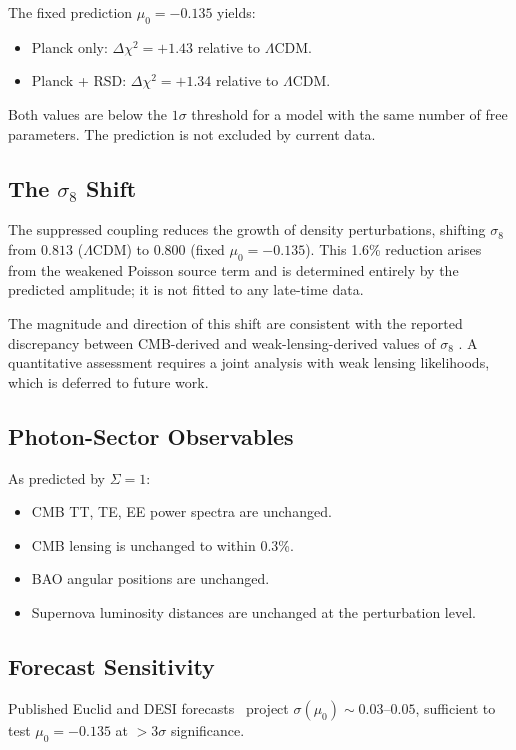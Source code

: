 \documentclass[11pt]{article}
\begin{document}
The fixed prediction $\mu_0 = -0.135$ yields:
\begin{itemize}
\item Planck only: $\Delta\chi^2 = +1.43$ relative to $\Lambda$CDM.
\item Planck + RSD: $\Delta\chi^2 = +1.34$ relative to $\Lambda$CDM.
\end{itemize}
Both values are below the $1\sigma$ threshold for a model with the same number
of free parameters.  The prediction is not excluded by current data.

\subsection{The $\sigma_8$ Shift}

The suppressed coupling reduces the growth of density perturbations, shifting
$\sigma_8$ from $0.813$ ($\Lambda$CDM) to $0.800$ (fixed $\mu_0 = -0.135$).
This 1.6\% reduction arises from the weakened Poisson source term and is
determined entirely by the predicted amplitude; it is not fitted to any
late-time data.

The magnitude and direction of this shift are consistent with the reported
discrepancy between CMB-derived and weak-lensing-derived values of $\sigma_8$
\citep{Heymans2021,Abbott2022}.  A quantitative assessment requires a joint
analysis with weak lensing likelihoods, which is deferred to future work.

\subsection{Photon-Sector Observables}

As predicted by $\Sigma = 1$:
\begin{itemize}
\item CMB TT, TE, EE power spectra are unchanged.
\item CMB lensing is unchanged to within 0.3\%.
\item BAO angular positions are unchanged.
\item Supernova luminosity distances are unchanged at the perturbation level.
\end{itemize}

\subsection{Forecast Sensitivity}

Published Euclid and DESI forecasts~\citep{Frusciante2025} project
$\sigma(\mu_0) \sim 0.03$--$0.05$, sufficient to test $\mu_0 = -0.135$
at $>3\sigma$ significance.
\end{document}
